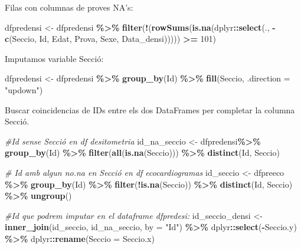 \documentclass[
]{book}
\newenvironment{Shaded}{\begin{snugshade}}{\end{snugshade}}
\newcommand{\AttributeTok}[1]{\textcolor[rgb]{0.13,0.29,0.53}{#1}}
\newcommand{\CommentTok}[1]{\textcolor[rgb]{0.56,0.35,0.01}{\textit{#1}}}
\newcommand{\DecValTok}[1]{\textcolor[rgb]{0.00,0.00,0.81}{#1}}
\newcommand{\FunctionTok}[1]{\textcolor[rgb]{0.13,0.29,0.53}{\textbf{#1}}}
\newcommand{\NormalTok}[1]{#1}
\newcommand{\OtherTok}[1]{\textcolor[rgb]{0.56,0.35,0.01}{#1}}
\newcommand{\SpecialCharTok}[1]{\textcolor[rgb]{0.81,0.36,0.00}{\textbf{#1}}}
\newcommand{\StringTok}[1]{\textcolor[rgb]{0.31,0.60,0.02}{#1}}
\theoremstyle{definition}
\theoremstyle{definition}
\theoremstyle{definition}
\theoremstyle{definition}
\theoremstyle{remark}
\begin{document}
Filas con columnas de proves NA's:

\begin{Shaded}
\begin{Highlighting}[]
\NormalTok{dfpredensi }\OtherTok{\textless{}{-}}\NormalTok{ dfpredensi }\SpecialCharTok{\%\textgreater{}\%}
  \FunctionTok{filter}\NormalTok{(}\SpecialCharTok{!}\NormalTok{(}\FunctionTok{rowSums}\NormalTok{(}\FunctionTok{is.na}\NormalTok{(dplyr}\SpecialCharTok{::}\FunctionTok{select}\NormalTok{(., }\SpecialCharTok{{-}}\FunctionTok{c}\NormalTok{(Seccio, Id, Edat, Prova, Sexe,  Data\_densi))))) }\SpecialCharTok{\textgreater{}=} \DecValTok{101}\NormalTok{)}
\end{Highlighting}
\end{Shaded}

Imputamos variable Secció:

\begin{Shaded}
\begin{Highlighting}[]
\NormalTok{dfpredensi }\OtherTok{\textless{}{-}}\NormalTok{ dfpredensi }\SpecialCharTok{\%\textgreater{}\%}
  \FunctionTok{group\_by}\NormalTok{(Id) }\SpecialCharTok{\%\textgreater{}\%}
  \FunctionTok{fill}\NormalTok{(Seccio, }\AttributeTok{.direction =} \StringTok{"updown"}\NormalTok{)  }
\end{Highlighting}
\end{Shaded}

Buscar coincidencias de IDs entre els dos DataFrames per completar la columna Secció.

\begin{Shaded}
\begin{Highlighting}[]
\CommentTok{\#Id sense Secció en df desitometria}
\NormalTok{id\_na\_seccio }\OtherTok{\textless{}{-}}\NormalTok{ dfpredensi}\SpecialCharTok{\%\textgreater{}\%} 
  \FunctionTok{group\_by}\NormalTok{(Id) }\SpecialCharTok{\%\textgreater{}\%}
  \FunctionTok{filter}\NormalTok{(}\FunctionTok{all}\NormalTok{(}\FunctionTok{is.na}\NormalTok{(Seccio))) }\SpecialCharTok{\%\textgreater{}\%} 
  \FunctionTok{distinct}\NormalTok{(Id, Seccio)}

\CommentTok{\# Id amb algun no.na en Secció en df ecocardiogramas}
\NormalTok{id\_seccio }\OtherTok{\textless{}{-}}\NormalTok{ dfpreeco }\SpecialCharTok{\%\textgreater{}\%}
  \FunctionTok{group\_by}\NormalTok{(Id) }\SpecialCharTok{\%\textgreater{}\%}
  \FunctionTok{filter}\NormalTok{(}\SpecialCharTok{!}\FunctionTok{is.na}\NormalTok{(Seccio)) }\SpecialCharTok{\%\textgreater{}\%} 
  \FunctionTok{distinct}\NormalTok{(Id, Seccio) }\SpecialCharTok{\%\textgreater{}\%} 
  \FunctionTok{ungroup}\NormalTok{()}

\CommentTok{\#Id que podrem imputar en el dataframe dfpredesi:}
\NormalTok{id\_seccio\_densi }\OtherTok{\textless{}{-}} \FunctionTok{inner\_join}\NormalTok{(id\_seccio, id\_na\_seccio, }\AttributeTok{by =} \StringTok{"Id"}\NormalTok{) }\SpecialCharTok{\%\textgreater{}\%} 
\NormalTok{  dplyr}\SpecialCharTok{::}\FunctionTok{select}\NormalTok{(}\SpecialCharTok{{-}}\NormalTok{Seccio.y) }\SpecialCharTok{\%\textgreater{}\%} 
\NormalTok{  dplyr}\SpecialCharTok{::}\FunctionTok{rename}\NormalTok{(}\AttributeTok{Seccio =}\NormalTok{ Seccio.x)}
\end{Highlighting}
\end{Shaded}
\end{document}
